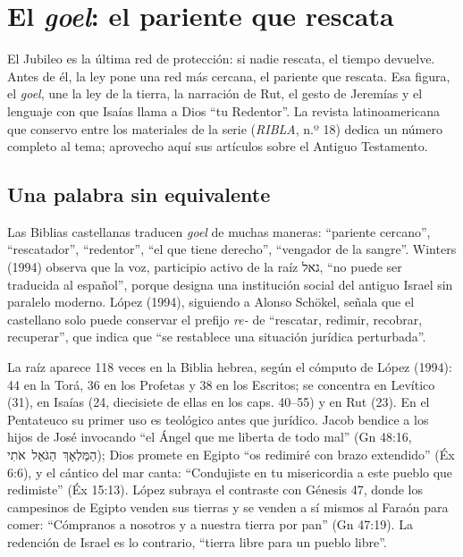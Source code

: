 \documentclass[11pt,letterpaper]{article}
\newcommand{\heb}[1]{\mbox{\foreignlanguage{hebrew}{#1}}}
\begin{document}
\section{El \emph{goel}: el pariente que rescata}

El Jubileo es la última red de protección: si nadie rescata, el tiempo devuelve. Antes de él, la ley pone una red más cercana, el pariente que rescata. Esa figura, el \emph{goel}, une la ley de la tierra, la narración de Rut, el gesto de Jeremías y el lenguaje con que Isaías llama a Dios ``tu Redentor''. La revista latinoamericana que conservo entre los materiales de la serie (\emph{RIBLA}, n.º 18) dedica un número completo al tema; aprovecho aquí sus artículos sobre el Antiguo Testamento.

\subsection{Una palabra sin equivalente}
Las Biblias castellanas traducen \emph{goel} de muchas maneras: ``pariente cercano'', ``rescatador'', ``redentor'', ``el que tiene derecho'', ``vengador de la sangre''. Winters (1994) observa que la voz, participio activo de la raíz \heb{גאל}, ``no puede ser traducida al español'', porque designa una institución social del antiguo Israel sin paralelo moderno. López (1994), siguiendo a Alonso Schökel, señala que el castellano solo puede conservar el prefijo \emph{re-} de ``rescatar, redimir, recobrar, recuperar'', que indica que ``se restablece una situación jurídica perturbada''.

La raíz aparece 118 veces en la Biblia hebrea, según el cómputo de López (1994): 44 en la Torá, 36 en los Profetas y 38 en los Escritos; se concentra en Levítico (31), en Isaías (24, diecisiete de ellas en los caps. 40--55) y en Rut (23). En el Pentateuco su primer uso es teológico antes que jurídico. Jacob bendice a los hijos de José invocando ``el Ángel que me liberta de todo mal'' (Gn 48:16, \heb{הַמַּלְאָךְ הַגֹּאֵל אֹתִי}); Dios promete en Egipto ``os redimiré con brazo extendido'' (Éx 6:6), y el cántico del mar canta: ``Condujiste en tu misericordia a este pueblo que redimiste'' (Éx 15:13). López subraya el contraste con Génesis 47, donde los campesinos de Egipto venden sus tierras y se venden a sí mismos al Faraón para comer: ``Cómpranos a nosotros y a nuestra tierra por pan'' (Gn 47:19). La redención de Israel es lo contrario, ``tierra libre para un pueblo libre''.
\end{document}
